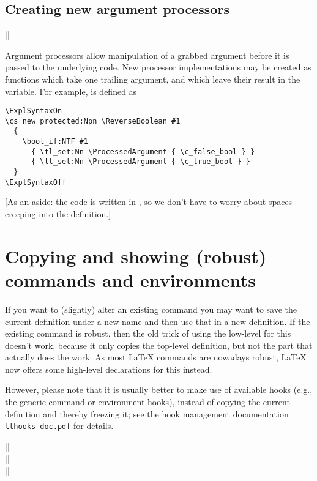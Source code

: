 \documentclass{ltxguide}
\begin{document}
\subsection{Creating new argument processors}

\begin{decl}
  |\ProcessedArgument|
\end{decl}
Argument processors allow manipulation of a grabbed argument before it is
passed to the underlying code. New processor implementations may be created
as functions which take one trailing argument, and which leave their result in
the  variable. For example,  is
defined as
\begin{verbatim}
\ExplSyntaxOn
\cs_new_protected:Npn \ReverseBoolean #1
  {
    \bool_if:NTF #1
      { \tl_set:Nn \ProcessedArgument { \c_false_bool } }
      { \tl_set:Nn \ProcessedArgument { \c_true_bool } }
  }
\ExplSyntaxOff
\end{verbatim}
[As an aside: the code is written in , so we don't have to
  worry about spaces creeping into the definition.]

\section{Copying and showing (robust) commands and environments}

If you want to (slightly) alter an existing command you may want to
save the current definition under a new name and then use that in a
new definition. If the existing command is robust, then the old trick of
using the low-level  for this doesn't work, because it only
copies the top-level definition, but not the part that actually does
the work. As most \LaTeX{} commands are nowadays robust, \LaTeX{}
now offers some high-level declarations for this instead.

However, please note that it is usually better to make use of
available hooks (e.g., the generic command or environment hooks),
instead of copying the current definition and thereby freezing it; see
the hook management documentation \texttt{lthooks-doc.pdf} for
details.

\begin{decl}
  |\NewCommandCopy|         \\
  |\RenewCommandCopy|       \\
  |\DeclareCommandCopy|    
\end{decl}
\end{document}
